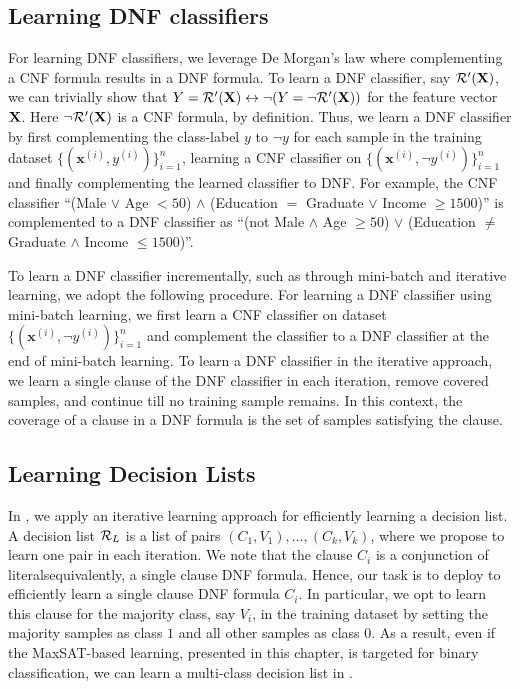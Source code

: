 \subsection{Learning DNF classifiers} 
\label{interpretability_imli_sec:dnf_learning}
For learning DNF classifiers, we leverage De Morgan's law where complementing a CNF formula results in a DNF formula. To learn a DNF classifier, say $ {\mathcal{R}}'(\mathbf{X}) $, we can trivially show that $ Y = {\mathcal{R}}'(\mathbf{X}) \leftrightarrow \neg (Y = \neg {\mathcal{R}}'(\mathbf{X})) $ for the feature vector $ \mathbf{X} $. Here $ \neg {\mathcal{R}}'(\mathbf{X}) $ is a CNF formula, by definition. Thus, we learn a DNF classifier by first complementing the class-label $ y $ to $ \neg y $ for each sample in the training dataset $ \{(\mathbf{x}^{(i)}, y^{(i)})\}_{i=1}^n $, learning a CNF classifier on $ \{(\mathbf{x}^{(i)}, \neg y^{(i)})\}_{i=1}^n $ and finally complementing the learned classifier to DNF. For example, the CNF classifier  ``(Male $ \vee $ Age $ < 50 $) $ \wedge $ (Education $ = $ Graduate $ \vee $ Income  $ \ge 1500 $)'' 	is complemented to a DNF classifier as 	 ``(not Male $ \wedge $ Age $ \ge 50 $) $ \vee $ (Education $ \ne $ Graduate $ \wedge $ Income $ \le 1500 $)''. 


To learn a DNF classifier incrementally, such as through mini-batch and iterative learning, we adopt the following procedure. For learning a DNF classifier using mini-batch learning, we first learn a CNF classifier on dataset $ \{(\mathbf{x}^{(i)}, \neg y^{(i)})\}_{i=1}^n $ and complement the classifier to a DNF classifier at the end of mini-batch learning. To learn a DNF classifier in the iterative approach, we  learn a single clause of the DNF classifier in each iteration, remove covered samples, and continue till no training sample remains. In this context, the coverage of a clause in a DNF formula is the set of samples satisfying the clause. 



\subsection{Learning Decision Lists}
In {\imli}, we apply an iterative learning approach for efficiently learning a  decision list. A decision list  $ {\mathcal{R}}_L $ is a list of pairs $ (C_1, V_1), \dots, (C_k, V_k) $, where we propose to learn one pair in each iteration.  We note that the clause $ C_i $ is a conjunction of literals\textemdash equivalently, a single clause DNF formula. Hence, our task is to deploy {\imli} to efficiently learn a single clause DNF formula $ C_i $. In particular, we opt to learn this clause for the majority class, say $ V_i $, in the training dataset by setting the majority samples as class $ 1 $ and all other samples as class $ 0 $. As a result, even if the MaxSAT-based learning, presented in this chapter, is targeted for binary classification, we can learn a multi-class decision list in {\imli}. 


